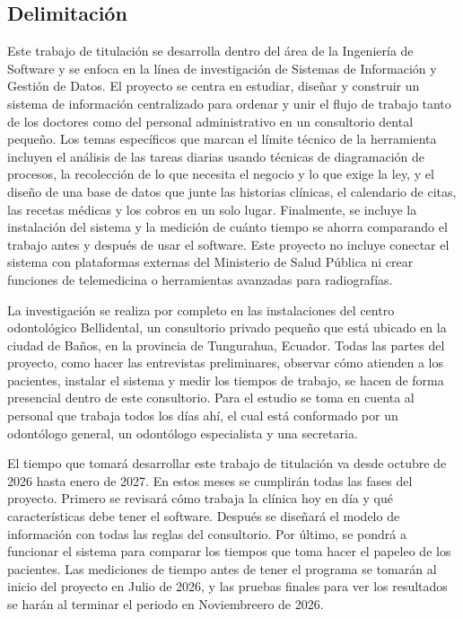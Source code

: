 \subsection{Delimitación}

Este trabajo de titulación se desarrolla dentro del área de la Ingeniería de Software y se enfoca en la línea de investigación de Sistemas de Información y Gestión de Datos. El proyecto se centra en estudiar, diseñar y construir un sistema de información centralizado para ordenar y unir el flujo de trabajo tanto de los doctores como del personal administrativo en un consultorio dental pequeño. Los temas específicos que marcan el límite técnico de la herramienta incluyen el análisis de las tareas diarias usando técnicas de diagramación de procesos, la recolección de lo que necesita el negocio y lo que exige la ley, y el diseño de una base de datos que junte las historias clínicas, el calendario de citas, las recetas médicas y los cobros en un solo lugar. Finalmente, se incluye la instalación del sistema y la medición de cuánto tiempo se ahorra comparando el trabajo antes y después de usar el software. Este proyecto no incluye conectar el sistema con plataformas externas del Ministerio de Salud Pública ni crear funciones de telemedicina o herramientas avanzadas para radiografías.

La investigación se realiza por completo en las instalaciones del centro odontológico Bellidental, un consultorio privado pequeño que está ubicado en la ciudad de Baños, en la provincia de Tungurahua, Ecuador. Todas las partes del proyecto, como hacer las entrevistas preliminares, observar cómo atienden a los pacientes, instalar el sistema y medir los tiempos de trabajo, se hacen de forma presencial dentro de este consultorio. Para el estudio se toma en cuenta al personal que trabaja todos los días ahí, el cual está conformado por un odontólogo general, un odontólogo especialista y una secretaria.

El tiempo que tomará desarrollar este trabajo de titulación va desde octubre de 2026 hasta enero de 2027. En estos meses se cumplirán todas las fases del proyecto. Primero se revisará cómo trabaja la clínica hoy en día y qué características debe tener el software. Después se diseñará el modelo de información con todas las reglas del consultorio. Por último, se pondrá a funcionar el sistema para comparar los tiempos que toma hacer el papeleo de los pacientes. Las mediciones de tiempo antes de tener el programa se tomarán al inicio del proyecto en Julio de 2026, y las pruebas finales para ver los resultados se harán al terminar el periodo en Noviembreero de 2026.